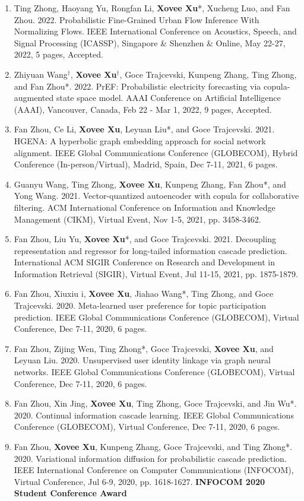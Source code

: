 \begin{enumerate}[resume]
    \item Ting Zhong, Haoyang Yu, Rongfan Li, \textbf{Xovee Xu}*, Xucheng Luo, and Fan Zhou. 2022. Probabilistic Fine-Grained Urban Flow Inference With Normalizing Flows. IEEE International Conference on Acoustics, Speech, and Signal Processing (ICASSP), Singapore \& Shenzhen \& Online, May 22-27, 2022, 5 pages, Accepted.
    \item Zhiyuan Wang$^\dagger$, \textbf{Xovee Xu}$^\dagger$, Goce Trajcevski, Kunpeng Zhang, Ting Zhong, and Fan Zhou*. 2022. PrEF: Probabilistic electricity forecasting via copula-augmented state space model. AAAI Conference on Artificial Intelligence (AAAI), Vancouver, Canada, Feb 22 - Mar 1, 2022, 9 pages, Accepted.
    \item Fan Zhou, Ce Li, \textbf{Xovee Xu}, Leyuan Liu*, and Goce Trajcevski. 2021. HGENA: A hyperbolic graph embedding approach for social network alignment. IEEE Global Communications Conference (GLOBECOM), Hybrid Conference (In-person/Virtual), Madrid, Spain, Dec 7-11, 2021, 6 pages.
    \item Guanyu Wang, Ting Zhong, \textbf{Xovee Xu}, Kunpeng Zhang, Fan Zhou*, and Yong Wang. 2021. Vector-quantized autoencoder with copula for collaborative filtering. ACM International Conference on Information and Knowledge Management (CIKM), Virtual Event, Nov 1-5, 2021, pp. 3458-3462.
    \item Fan Zhou, Liu Yu, \textbf{Xovee Xu}*, and Goce Trajcevski. 2021. Decoupling representation and regressor for long-tailed information cascade prediction. International ACM SIGIR Conference on Research and Development in Information Retrieval (SIGIR), Virtual Event, Jul 11-15, 2021, pp. 1875-1879.
    \item Fan Zhou, Xiuxiu \swashQ i, \textbf{Xovee Xu}, Jiahao Wang*, Ting Zhong, and Goce Trajcevski. 2020. Meta-learned user preference for topic participation prediction. IEEE Global Communications Conference (GLOBECOM), Virtual Conference, Dec 7-11, 2020, 6 pages.
    \item Fan Zhou, Zijing Wen, Ting Zhong*, Goce Trajcevski, \textbf{Xovee Xu}, and Leyuan Liu. 2020. Unsupervised user identity linkage via graph neural networks. IEEE Global Communications Conference (GLOBECOM), Virtual Conference, Dec 7-11, 2020, 6 pages.
    \item Fan Zhou, Xin Jing, \textbf{Xovee Xu}, Ting Zhong, Goce Trajcevski, and Jin Wu*. 2020. Continual information cascade learning. IEEE Global Communications Conference (GLOBECOM), Virtual Conference, Dec 7-11, 2020, 6 pages.
    \item Fan Zhou, \textbf{Xovee Xu}, Kunpeng Zhang, Goce Trajcevski, and Ting Zhong*. 2020. Variational information diffusion for probabilistic cascade prediction. IEEE International Conference on Computer Communications (INFOCOM), Virtual Conference, Jul 6-9, 2020, pp. 1618-1627.
    \newline \textbf{\color{red}INFOCOM 2020 Student Conference Award}
\end{enumerate}

